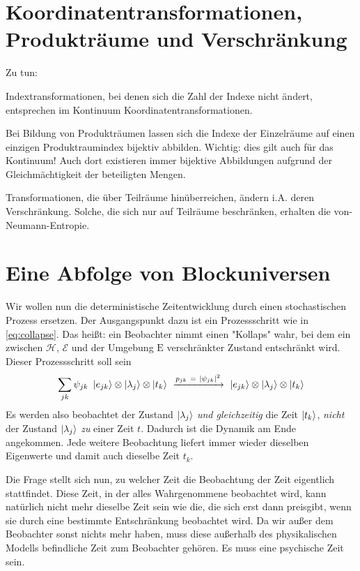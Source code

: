\documentclass[12pt]{article}
\begin{document}

\section{Koordinatentransformationen, Produkträume und Verschränkung}

Zu tun: 

Indextransformationen, bei denen sich die Zahl der Indexe nicht ändert, entsprechen im Kontinuum Koordinatentransformationen. 

Bei Bildung von Produkträumen lassen sich die Indexe der Einzelräume auf einen einzigen Produktraumindex bijektiv abbilden. Wichtig: dies gilt auch für das Kontinuum! Auch dort existieren immer bijektive Abbildungen aufgrund der Gleichmächtigkeit der beteiligten Mengen.

Transformationen, die über Teilräume hinüberreichen, ändern i.A. deren Verschränkung. Solche, die sich nur auf Teilräume beschränken, erhalten die von-Neumann-Entropie.

\section{Eine Abfolge von Blockuniversen}

Wir wollen nun die deterministische Zeitentwicklung durch einen stochastischen Prozess ersetzen. Der Ausgangspunkt dazu ist ein Prozessschritt wie in \eqref{eq:collapse}. Das heißt: ein Beobachter nimmt einen "Kollaps" wahr, bei dem ein zwischen $\mathscr{H}$, $\mathscr{E}$ und der Umgebung $\mathrm{E}$ verschränkter Zustand entschränkt wird. Dieser Prozessschritt soll sein
\begin{equation*} 
\sum_{jk} \psi_{jk}\ \ket{e_{jk}} \otimes \ket{\lambda_j} \otimes \ket{t_k} 
\ \xrightarrow{p_{jk}\ =\ \left|\psi_{jk}\right|^2}\ 
\ket{e_{jk}} \otimes \ket{\lambda_j} \otimes \ket{t_k}
\end{equation*}
Es werden also beobachtet der Zustand $\ket{\lambda_j}$ \emph{und gleichzeitig} die Zeit $\ket{t_k}$, \emph{nicht} der Zustand $\ket{\lambda_j}$ \emph{zu} einer Zeit $t$. Dadurch ist die Dynamik am Ende angekommen. Jede weitere Beobachtung liefert immer wieder dieselben Eigenwerte und damit auch dieselbe Zeit $t_k$. 

Die Frage stellt sich nun, zu welcher Zeit die Beobachtung der Zeit eigentlich stattfindet. Diese Zeit, in der alles Wahrgenommene beobachtet wird, kann natürlich nicht mehr dieselbe Zeit sein wie die, die sich erst dann preisgibt, wenn sie durch eine bestimmte Entschränkung beobachtet wird. Da wir außer dem Beobachter sonst nichts mehr haben, muss diese außerhalb des physikalischen Modells befindliche Zeit zum Beobachter gehören. Es muss eine psychische Zeit sein.
\end{document}
